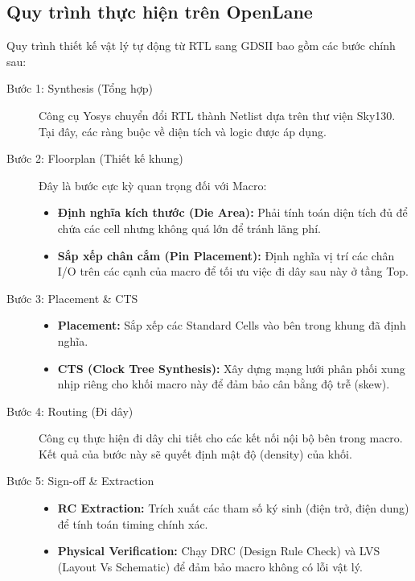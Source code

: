 \documentclass[12pt,a4paper]{report}
\begin{document}
\subsection{Quy trình thực hiện trên OpenLane}
Quy trình thiết kế vật lý tự động từ RTL sang GDSII bao gồm các bước chính sau:
\begin{description}
    \item[Bước 1: Synthesis (Tổng hợp)]
    Công cụ Yosys chuyển đổi RTL thành Netlist dựa trên thư viện Sky130. Tại đây, các ràng buộc về diện tích và logic được áp dụng.

    \item[Bước 2: Floorplan (Thiết kế khung)]
    Đây là bước cực kỳ quan trọng đối với Macro:
    \begin{itemize}
        \item \textbf{Định nghĩa kích thước (Die Area):} Phải tính toán diện tích đủ để chứa các cell nhưng không quá lớn để tránh lãng phí.
        \item \textbf{Sắp xếp chân cắm (Pin Placement):} Định nghĩa vị trí các chân I/O trên các cạnh của macro để tối ưu việc đi dây sau này ở tầng Top.
    \end{itemize}

    \item[Bước 3: Placement \& CTS] \hfill
    \begin{itemize}
        \item \textbf{Placement:} Sắp xếp các Standard Cells vào bên trong khung đã định nghĩa.
        \item \textbf{CTS (Clock Tree Synthesis):} Xây dựng mạng lưới phân phối xung nhịp riêng cho khối macro này để đảm bảo cân bằng độ trễ (skew).
    \end{itemize}

    \item[Bước 4: Routing (Đi dây)]
    Công cụ thực hiện đi dây chi tiết cho các kết nối nội bộ bên trong macro. Kết quả của bước này sẽ quyết định mật độ (density) của khối.

    \item[Bước 5: Sign-off \& Extraction] \hfill
    \begin{itemize}
        \item \textbf{RC Extraction:} Trích xuất các tham số ký sinh (điện trở, điện dung) để tính toán timing chính xác.
        \item \textbf{Physical Verification:} Chạy DRC (Design Rule Check) và LVS (Layout Vs Schematic) để đảm bảo macro không có lỗi vật lý.
    \end{itemize}
\end{description}
\end{document}
